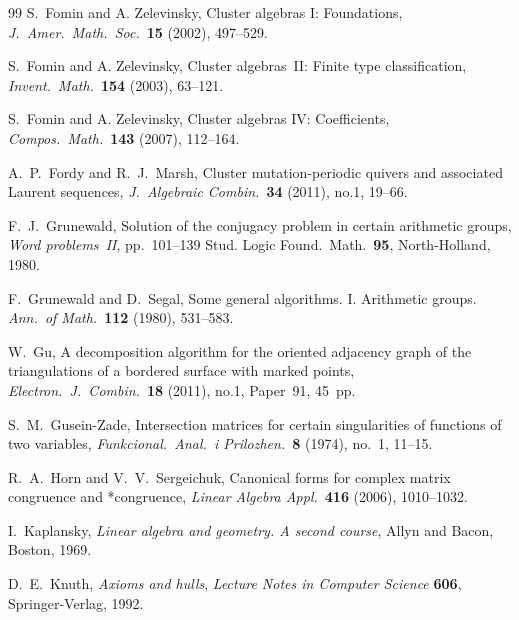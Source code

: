 \documentclass[11pt, letterpaper]{amsart}
\theoremstyle{definition}
\numberwithin{equation}{section}
\begin{document}
\begin{thebibliography}{99}
S.~Fomin and A. Zelevinsky, 
Cluster algebras I: Foundations, 
\textsl{J.~Amer.\ Math.\ Soc.}\ \textbf{15} (2002), 497--529. 

S.~Fomin and A. Zelevinsky, 
Cluster algebras~II: Finite type classification, 
\textsl{Invent.\ Math.}\ \textbf{154} (2003), 63--121. 

S.~Fomin and A. Zelevinsky, 
Cluster algebras IV: Coefficients, 
\textsl{Compos.\ Math.}\ \textbf{143} (2007), \hbox{112--164}. 

A.~P.~Fordy and R.~J.~Marsh, 
Cluster mutation-periodic quivers and associated Laurent sequences, \linebreak[3]
\textsl{J.~Algebraic Combin.}\ \textbf{34} (2011), no.1, 19--66.


F.~J.~Grunewald, 
Solution of the conjugacy problem in certain arithmetic groups, 
\emph{Word problems~II}, pp.~101--139
Stud. Logic Found.\ Math.\ \textbf{95}, 
North-Holland, 1980. 

F.~Grunewald and D.~Segal, 
Some general algorithms. I. Arithmetic groups.
\textsl{Ann.\ of Math.}\ \textbf{112} (1980), 531--583.

W.~Gu, 
A decomposition algorithm for the oriented adjacency graph of the triangulations of a bordered surface with marked points, 
\textsl{Electron.\ J.\ Combin.}\ \textbf{18} (2011), no.1, Paper~91, 45~pp.

S.~M.~Gusein-Zade, 
Intersection matrices for certain singularities of
functions of two variables, 
\textsl{Funkcional.\ Anal.\ i Prilozhen.}\ \textbf{8} (1974), no.~1,
11--15. 

R.~A.~Horn and V.~V.~Sergeichuk, 
Canonical forms for complex matrix congruence and *congruence, 
\textsl{Linear Algebra Appl.}\ \textbf{416} (2006), 1010--1032. 


I.~Kaplansky,
\emph{Linear algebra and geometry. A second course}, 
Allyn and Bacon, Boston, 1969.


D.~E.~Knuth, %
\emph{Axioms and hulls},
\textsl{Lecture Notes in Computer Science} 
\textbf{606}, Springer-Verlag, 1992. %


\end{thebibliography}
\end{document}
